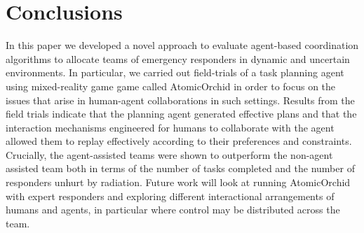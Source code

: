 \section{Conclusions}\label{sec:conclusions}
\noindent In this paper we developed a novel approach to evaluate agent-based coordination algorithms to allocate teams of emergency responders in dynamic and uncertain environments.  In particular, we carried out field-trials of a task planning agent using mixed-reality game game called AtomicOrchid in order to focus on the issues that arise in human-agent collaborations in such settings. Results from the field trials indicate that  the planning agent generated effective plans and that the interaction mechanisms engineered for humans to collaborate with the agent allowed them to replay effectively according to their preferences and constraints. Crucially, the agent-assisted teams were shown to outperform the non-agent assisted team both in terms of the number of tasks completed and the number of responders unhurt by radiation.  Future work will look at running AtomicOrchid with expert responders and  exploring different interactional arrangements of humans and agents, in particular where control may be distributed across the team.